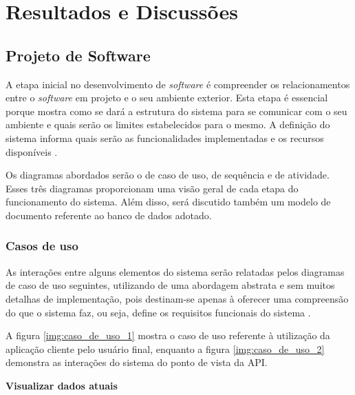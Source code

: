 \chapter{Resultados e Discussões} \label{ch:RD}

\section{Projeto de Software} \label{sec:PS}

A etapa inicial no desenvolvimento de \textit{software} é compreender os relacionamentos entre o \textit{software} em projeto e o seu ambiente exterior. Esta etapa é essencial porque mostra como se dará a estrutura do sistema para se comunicar com o seu ambiente e quais serão os limites estabelecidos para o mesmo. A definição do sistema informa quais serão as funcionalidades implementadas e os recursos disponíveis \cite{sommerville2011engenharia}.

Os diagramas abordados serão o de caso de uso, de sequência e de atividade. Esses três diagramas proporcionam uma visão geral de cada etapa do funcionamento do sistema. Além disso, será discutido também um modelo de documento referente ao banco de dados adotado.

\subsection{Casos de uso} \label{subsec:casosDeUso}

As interações entre alguns elementos do sistema serão relatadas pelos diagramas de caso de uso seguintes, utilizando de uma abordagem abstrata e sem muitos detalhas de implementação, pois destinam-se apenas à oferecer uma compreensão do que o sistema faz, ou seja, define os requisitos funcionais do sistema \cite{sommerville2011engenharia}.

A figura \ref{img:caso_de_uso_1} mostra o caso de uso referente à utilização da aplicação cliente pelo usuário final, enquanto a figura \ref{img:caso_de_uso_2} demonstra as interações do sistema do ponto de vista da API.

\newpage

\textbf{Visualizar dados atuais}

